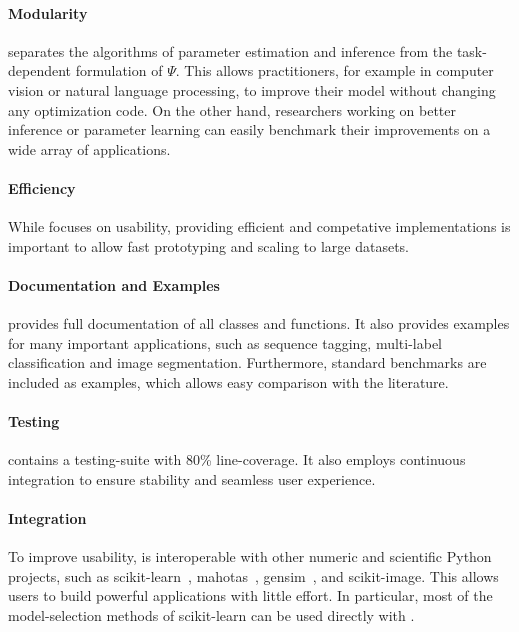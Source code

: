 \paragraph{Modularity} \pystruct separates the algorithms of parameter estimation and
     inference from the task-dependent formulation of $\Psi$. This allows
     practitioners, for example in computer vision or natural language
     processing, to improve their model without changing any optimization
     code. On the other hand, researchers working on better inference or
     parameter learning can easily benchmark their improvements on a wide
     array of applications.

\paragraph{Efficiency}
     While \pystruct focuses on usability, providing efficient and competative
     implementations is important to allow fast prototyping and scaling to
     large datasets.

\paragraph{Documentation and Examples}
     \pystruct provides full documentation of all classes and functions.  It
     also provides examples for many important applications, such as
     sequence tagging, multi-label classification and image segmentation.
     Furthermore, standard benchmarks are included as examples, which allows
     easy comparison with the literature.

\paragraph{Testing}
     \pystruct contains a testing-suite with 80\% line-coverage. It also employs continuous integration
     to ensure stability and seamless user experience.

\paragraph{Integration}
     To improve usability, \pystruct is interoperable with other numeric and scientific Python projects,
     such as {\sc scikit-learn}~\citep{pedregosa2011scikit},
     {\sc mahotas}~\citep{coelho:mahotas}, {\sc gensim}~\citep{rehurek_lrec}, and {\sc scikit-image}.
     This allows users to build powerful applications with little effort. In
     particular, most of the model-selection methods of {\sc scikit-learn} can be used
     directly with \pystruct.


